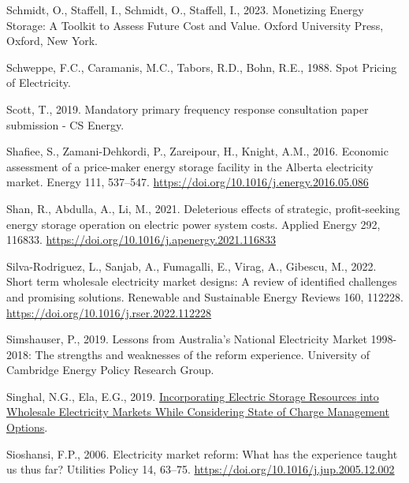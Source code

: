 \documentclass[12pt,a4paper,]{report}
\newlength{\cslhangindent}
\newenvironment{CSLReferences}[2] %
 {%
  \setlength{\parindent}{0pt}
  \ifodd #1 \everypar{\setlength{\hangindent}{\cslhangindent}}\ignorespaces\fi
  \ifnum #2 > 0
  \setlength{\parskip}{#2\baselineskip}
  \fi
 }%
 {}
\begin{document}
\begin{CSLReferences}{1}{0}
\leavevmode{}%
Schmidt, O., Staffell, I., Schmidt, O., Staffell, I., 2023. Monetizing
{Energy Storage}: {A Toolkit} to {Assess Future Cost} and {Value}.
Oxford University Press, Oxford, New York.

\leavevmode{}%
Schweppe, F.C., Caramanis, M.C., Tabors, R.D., Bohn, R.E., 1988. Spot
{Pricing} of {Electricity}.

\leavevmode{}%
Scott, T., 2019. Mandatory primary frequency response consultation paper
submission - {CS Energy}.

\leavevmode{}%
Shafiee, S., Zamani-Dehkordi, P., Zareipour, H., Knight, A.M., 2016.
Economic assessment of a price-maker energy storage facility in the
{Alberta} electricity market. Energy 111, 537--547.
\url{https://doi.org/10.1016/j.energy.2016.05.086}

\leavevmode{}%
Shan, R., Abdulla, A., Li, M., 2021. Deleterious effects of strategic,
profit-seeking energy storage operation on electric power system costs.
Applied Energy 292, 116833.
\url{https://doi.org/10.1016/j.apenergy.2021.116833}

\leavevmode{}%
Silva-Rodriguez, L., Sanjab, A., Fumagalli, E., Virag, A., Gibescu, M.,
2022. Short term wholesale electricity market designs: {A} review of
identified challenges and promising solutions. Renewable and Sustainable
Energy Reviews 160, 112228.
\url{https://doi.org/10.1016/j.rser.2022.112228}

\leavevmode{}%
Simshauser, P., 2019. Lessons from {Australia}'s {National Electricity
Market} 1998-2018: The strengths and weaknesses of the reform
experience. University of Cambridge Energy Policy Research Group.

\leavevmode{}%
Singhal, N.G., Ela, E.G., 2019.
\href{https://cigre-usnc.org/wp-content/uploads/2019/11/3.-GOTF-11042019_EPRI-NS.pdf}{Incorporating
{Electric Storage Resources} into {Wholesale Electricity Markets While
Considering State} of {Charge Management Options}}.

\leavevmode{}%
Sioshansi, F.P., 2006. Electricity market reform: {What} has the
experience taught us thus far? Utilities Policy 14, 63--75.
\url{https://doi.org/10.1016/j.jup.2005.12.002}


\end{CSLReferences}
\end{document}
